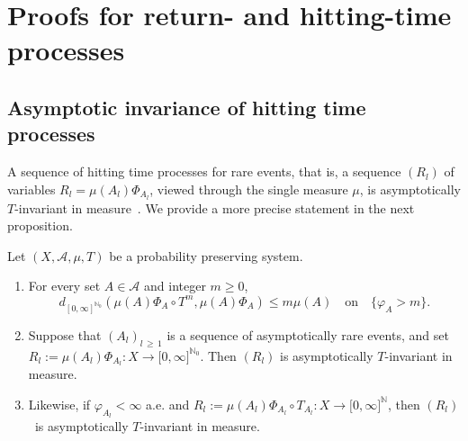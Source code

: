 \documentclass[10pt]{amsart}
\theoremstyle{definition}\newtheorem{defi}[theo]{Definition}\newtheorem{rema}[theo]{Remark}\newtheorem{exam}[theo]{Example}\newtheorem{exem}[theo]{Example}\newtheorem{nota}[theo]{Notation}
\newcommand{\clA}{\mathcal{A}}
\newcommand{\bbN}{\mathbb{N}}
\newcommand*{\alphenumi}{\renewcommand*{\theenumi}{\alph{enumi}}}
\begin{document}
\section{Proofs for return- and hitting-time processes}\label{S_PfsRH}


\subsection{Asymptotic invariance of hitting time processes}
A sequence of hitting time processes for rare events, that is, a sequence $(R_{l})$ of variables $R_{l}=\mu(A_{l})\Phi_{A_{l}}$, viewed through the single measure $\mu$, is asymptotically $T$-invariant in measure~\cite[Corollary~6]{Z7}. We provide a more precise statement in the next proposition.

\begin{prop}\label{P_AsyInvarHitProc}
Let $(X,\clA,\mu,T)$ be a probability preserving system.
\begin{enumerate}\alphenumi
\item\label{prop7.1.a} For every set $A\in\clA$ and integer $m\geq0$,
\begin{equation}\label{Eq_uzuzuzuzu}
d_{[0,\infty]^{\bbN_{0}}}\left(\mu(A)\Phi_{A}\circ T^{m},\mu(A)\Phi_{A}\right)\leq m\mu(A) \quad\text{on} \quad\{\varphi_{A}>m\}. 
\end{equation}
\item\label{prop7.1.b} Suppose that $(A_{l})_{l\,\geq\,1}$ is a sequence of asymptotically rare events, and set $R_{l}:=\mu(A_{l})\Phi_{A_{l}}:X\rightarrow
\lbrack0,\infty]^{\bbN_{0}}$. Then $(R_{l})$ is asymptotically $T$-invariant in measure.
\item\label{prop7.1.c} Likewise, if $ \varphi_{A_{l}} <
\infty$ a.e. and $R_{l}:=\mu (A_{l})\Phi_{A_{l}}\circ T_{A_{l}}:X\rightarrow\lbrack0,\infty]^{\bbN}$, then $(R_{l})$\emph{\ }is asymptotically $T$-invariant in measure.
\end{enumerate}
\end{prop}
\end{document}
